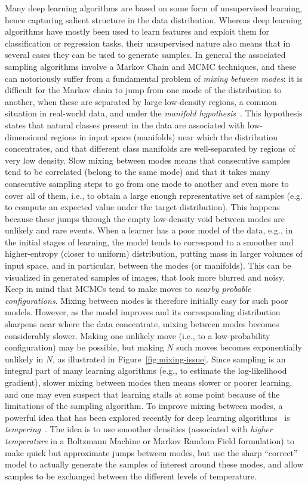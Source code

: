 Many deep learning algorithms are based on some form of unsupervised
learning, hence capturing salient structure in the data
distribution. Whereas deep learning algorithms have mostly been used to
learn features and exploit them for classification or regression tasks,
their unsupervised nature also means that in several cases they can be used
to generate samples. In general the associated sampling algorithms involve
a Markov Chain and MCMC techniques, and these can notoriously suffer from a
fundamental problem of {\em mixing between modes}: it is difficult for the Markov chain
to jump from one mode of the distribution to another, when these are
separated by large low-density regions, a common situation in real-world
data, and under the {\em manifold hypothesis}~\citep{Cayton-2005,Narayanan+Mitter-NIPS2010}. 
This hypothesis states that
natural classes present in the data are associated with low-dimensional
regions in input space (manifolds) near which the distribution
concentrates, and that different class manifolds are well-separated by
regions of very low density. Slow mixing between modes means that consecutive samples
tend to be correlated (belong to the same mode) and that it takes many
consecutive sampling steps to go from one mode to another and even more to
cover all of them, i.e., to obtain a large enough representative set of samples
(e.g. to compute an expected value under the target distribution).
 This happens because these jumps through the empty low-density void
between modes are unlikely and rare events. When a learner has a poor model
of the data, e.g., in the initial stages of learning, the model tends to
correspond to a smoother and higher-entropy (closer to uniform) distribution, putting
mass in larger volumes of input space, and in particular, between the modes
(or manifolds). This can be visualized in generated samples of images, that
look more blurred and noisy. Keep in mind that MCMCs tend to make moves to 
{\em nearby probable configurations}.
Mixing between modes is therefore initially easy for such poor models.
However, as the model improves and its corresponding distribution sharpens
near where the data concentrate, mixing between modes becomes considerably slower. 
Making one unlikely move (i.e., to a low-probability configuration) may be possible, 
but making $N$ such moves becomes exponentially unlikely in $N$, as illustrated
in Figure~\ref{fig:mixing-issue}.
Since
sampling is an integral part of many learning algorithms (e.g., to estimate
the log-likelihood gradient), slower mixing between modes then means slower or poorer
learning, and one may even suspect that learning stalls at some point
because of the limitations of the sampling algorithm.  
To improve mixing between modes, a powerful idea that
has been explored recently for deep learning 
algorithms~\citep{Desjardins+al-2010,Cho10IJCNN,Salakhutdinov-2010,Salakhutdinov-ICML2010} 
is {\em tempering}~\citep{Neal94b}.
The idea is to use smoother densities (associated with {\em higher temperature}
in a Boltzmann Machine or 
Markov Random Field formulation) to make quick but approximate jumps 
between modes, but
use the sharp ``correct'' model to actually generate the samples of interest
around these modes, and allow samples to be exchanged between the different
levels of temperature.

